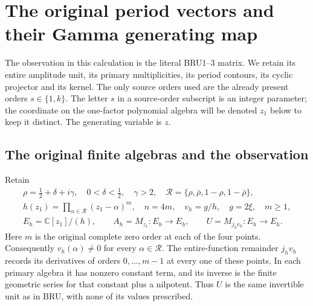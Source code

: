 \section{The original period vectors and their Gamma generating map}
\label{sec:OPG}

The observation in this calculation is the literal BRU1--3 matrix. We
retain its entire amplitude unit, its primary multiplicities, its
period contours, its cyclic projector and its kernel. The only source
orders used are the already present orders $s\in\{1,k\}$. The letter
$s$ in a source-order subscript is an integer parameter; the coordinate
on the one-factor polynomial algebra will be denoted $z_1$ below to
keep it distinct. The generating variable is $z$.

\subsection{The original finite algebras and the observation}
Retain
\[
\begin{gathered}
 \rho=\tfrac12+\delta+i\gamma,\quad 0<\delta<\tfrac12,\quad\gamma>2,
 \quad\mathcal R=\{\rho,\bar\rho,1-\rho,1-\bar\rho\},\\
 h(z_1)=\prod_{\alpha\in\mathcal R}(z_1-\alpha)^m,
 \quad n=4m,\quad v_h=g/h,\quad g=2\xi,\quad m\geq1,\\
 E_h=\mathbb C[z_1]/(h),\qquad A_h=M_{z_1}:E_h\to E_h,
 \qquad U=M_{j_hv_h}:E_h\to E_h.
\end{gathered}\tag{OPG1}
\]
Here $m$ is the original complete zero order at each of the four
points. Consequently $v_h(\alpha)\ne0$ for every $\alpha\in\mathcal R$.
The entire-function remainder $j_hv_h$ records its derivatives of
orders $0,\ldots,m-1$ at every one of these points. In each primary
algebra it has nonzero constant term, and its inverse is the finite
geometric series for that constant plus a nilpotent. Thus $U$ is the
same invertible unit as in BRU, with none of its values prescribed.

